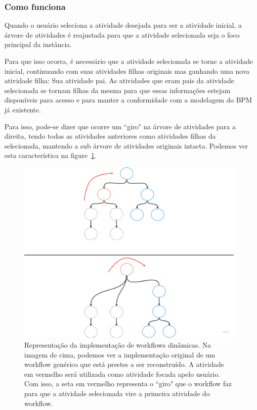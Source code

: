 \subsubsection{Como funciona}

Quando o usuário seleciona a atividade desejada para ser a atividade inicial, a árvore de atividades é reajustada para que a atividade selecionada seja o foco principal da instância.

Para que isso ocorra, é necessário que a atividade selecionada se torne a atividade inicial, continuando com suas atividades filhas originais mas ganhando uma nova atividade filha: Sua atividade pai. As atividades que eram pais da atividade selecionada se tornam filhas da mesma para que essas informações estejam disponíveis para acesso e para manter a conformidade com a modelagem do BPM já existente.

Para isso, pode-se dizer que ocorre um ``giro" na árvore de atividades para a direita, tendo todas as atividades anteriores como atividades filhas da selecionada, mantendo a sub árvore de atividades originais intacta. Podemos ver esta característica na figure~\ref{fig:primeira_implementacao}.

\begin{figure}
    \centering
    \includegraphics[width=1\textwidth]{imgs/Implementacoes/primeiraImplementacao.png}
    \caption{Representação da implementação de workflows dinâmicas. Na imagem de cima, podemos ver a implementação original de um workflow genérico que está prestes a ser reconstruído. A atividade em vermelho será utilizada como atividade focada apelo usuário. Com isso, a seta em vermelho representa o ``giro" que o workflow faz para que a atividade selecionada vire a primeira atividade do workflow.}
    \label{fig:primeira_implementacao}
\end{figure}

